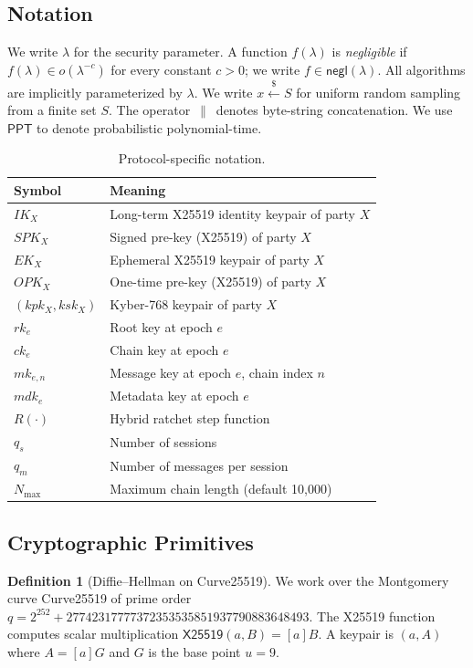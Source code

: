 \documentclass[11pt,a4paper]{article}
\theoremstyle{definition}
\newtheorem{definition}[theorem]{Definition}
\newcommand{\secpar}{\lambda}
\newcommand{\negl}{\mathsf{negl}}
\newcommand{\ppt}{\mathsf{PPT}}
\newcommand{\DH}{\textsf{X25519}}
\newcommand{\concat}{\,\|\,}
\newcommand{\getsr}{\stackrel{\$}{\gets}}
\newcommand{\rk}{\mathit{rk}}
\newcommand{\ck}{\mathit{ck}}
\newcommand{\mk}{\mathit{mk}}
\newcommand{\mdk}{\mathit{mdk}}
\newcommand{\IK}{\mathit{IK}}
\newcommand{\SPK}{\mathit{SPK}}
\newcommand{\EK}{\mathit{EK}}
\newcommand{\OPK}{\mathit{OPK}}
\begin{document}
\subsection{Notation}

We write $\secpar$ for the security parameter. A function $f(\secpar)$ is \emph{negligible} if $f(\secpar) \in o(\secpar^{-c})$ for every constant $c > 0$; we write $f \in \negl(\secpar)$. All algorithms are implicitly parameterized by $\secpar$. We write $x \getsr S$ for uniform random sampling from a finite set $S$. The operator $\concat$ denotes byte-string concatenation. We use $\ppt$ to denote probabilistic polynomial-time.

\begin{table}[h]
\centering
\caption{Protocol-specific notation.}\label{tab:notation}
\small
\begin{tabular}{@{}ll@{}}
\toprule
Symbol & Meaning \\
\midrule
$\IK_X$ & Long-term X25519 identity keypair of party $X$ \\
$\SPK_X$ & Signed pre-key (X25519) of party $X$ \\
$\EK_X$ & Ephemeral X25519 keypair of party $X$ \\
$\OPK_X$ & One-time pre-key (X25519) of party $X$ \\
$(kpk_X, ksk_X)$ & Kyber-768 keypair of party $X$ \\
$\rk_e$ & Root key at epoch $e$ \\
$\ck_e$ & Chain key at epoch $e$ \\
$\mk_{e,n}$ & Message key at epoch $e$, chain index $n$ \\
$\mdk_e$ & Metadata key at epoch $e$ \\
$R(\cdot)$ & Hybrid ratchet step function \\
$q_s$ & Number of sessions \\
$q_m$ & Number of messages per session \\
$N_{\max}$ & Maximum chain length (default 10{,}000) \\
\bottomrule
\end{tabular}
\end{table}

\subsection{Cryptographic Primitives}

\begin{definition}[Diffie--Hellman on Curve25519]\label{def:dh}
We work over the Montgomery curve Curve25519 of prime order $q = 2^{252} + 27742317777372353535851937790883648493$. The X25519 function~\cite{rfc7748} computes scalar multiplication $\DH(a, B) = [a]B$. A keypair is $(a, A)$ where $A = [a]G$ and $G$ is the base point $u = 9$.
\end{definition}
\end{document}
